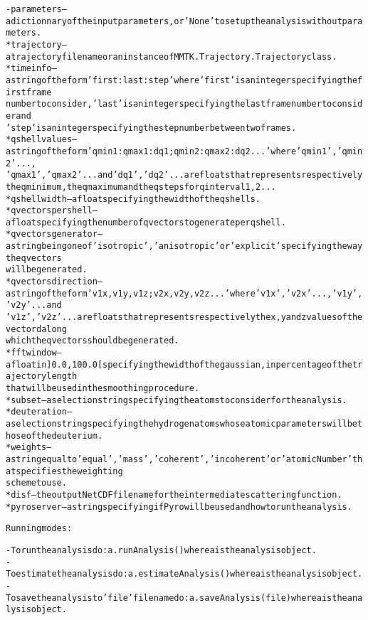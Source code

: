 \begin{alltt}
    - {\textbar}parameters{\textbar} -- a dictionnary of the input parameters, or 'None' to set up the analysis without parameters.
        * trajectory        -- a trajectory file name or an instance of MMTK.Trajectory.Trajectory class.
        * timeinfo          -- a string of the form 'first:last:step' where 'first' is an integer specifying the first frame 
                               number to consider, 'last' is an integer specifying the last frame number to consider and 
                               'step' is an integer specifying the step number between two frames.
        * qshellvalues      -- a string of the form 'qmin1:qmax1:dq1;qmin2:qmax2:dq2...' where 'qmin1', 'qmin2' ... , 
                               'qmax1', 'qmax2' ... and 'dq1', 'dq2' ... are floats that represents respectively 
                               the q minimum, the q maximum and the q steps for q interval 1, 2 ...
        * qshellwidth       -- a float specifying the width of the q shells.
        * qvectorspershell  -- a float specifying the number of q vectors to generate per q shell.
        * qvectorsgenerator -- a string being one of 'isotropic', 'anisotropic' or 'explicit' specifying the way the q vectors
                               will be generated.
        * qvectorsdirection -- a string of the form 'v1x,v1y,v1z;v2x,v2y,v2z...' where 'v1x', 'v2x' ..., 'v1y', 'v2y' ... and
                               'v1z', 'v2z' ... are floats that represents respectively the x, y and z values of the vectord along 
                               which the q vectors should be generated.
        * fftwindow         -- a float in ]0.0,100.0[ specifying the width of the gaussian, in percentage of the trajectory length
                               that will be used in the smoothing procedure.
        * subset            -- a selection string specifying the atoms to consider for the analysis.
        * deuteration       -- a selection string specifying the hydrogen atoms whose atomic parameters will be those of the deuterium.
        * weights           -- a string equal to 'equal', 'mass', 'coherent' , 'incoherent' or 'atomicNumber' that specifies the weighting
                               scheme to use.
        * disf              -- the output NetCDF file name for the intermediate scattering function.
        * pyroserver        -- a string specifying if Pyro will be used and how to run the analysis.
    
Running modes:

    - To run the analysis do: a.runAnalysis() where a is the analysis object.
    - To estimate the analysis do: a.estimateAnalysis() where a is the analysis object.
    - To save the analysis to 'file' file name do: a.saveAnalysis(file) where a is the analysis object.
    
\end{alltt}



